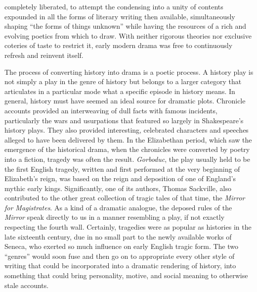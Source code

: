 completely liberated, to attempt the condensing into a unity of contents expounded in all the forms of literary writing then available, simultaneously shaping ``the forms of things unknown'' while having the resources of a rich and evolving poetics from which to draw. With neither rigorous theories nor exclusive coteries of taste to restrict it, early modern drama was free to continuously refresh and reinvent itself.

The process of converting history into drama is a poetic process. A history play is not simply a play in the genre of history but belongs to a larger category that articulates in a particular mode what a specific episode in history means. In general, history must have seemed an ideal source for dramatic plots. Chronicle accounts provided an interweaving of dull facts with famous incidents, particularly the wars and usurpations that featured so largely in Shakespeare's history plays. They also provided interesting, celebrated characters and speeches alleged to have been delivered by them. In the Elizabethan period, which saw the emergence of the historical drama, when the chronicles were converted by poetry into a fiction, tragedy was often the result. \emph{Gorboduc}, the play usually held to be the first English tragedy, written and first performed at the very beginning of Elizabeth's reign, was based on the reign and deposition of one of England's mythic early kings. Significantly, one of its authors, Thomas Sackville, also contributed to the other great collection of tragic tales of that time, the \emph{Mirror for Magistrates}. As a kind of a dramatic analogue, the deposed rules of the \emph{Mirror} speak directly to us in a manner resembling a play, if not exactly respecting the fourth wall. Certainly, tragedies were as popular as histories in the late sixteenth century, due in no small part to the newly available works of Seneca, who exerted so much influence on early English tragic form. The two ``genres'' would soon fuse and then go on to appropriate every other style of writing that could be incorporated into a dramatic rendering of history, into something that could bring personality, motive, and social meaning to otherwise stale accounts.

